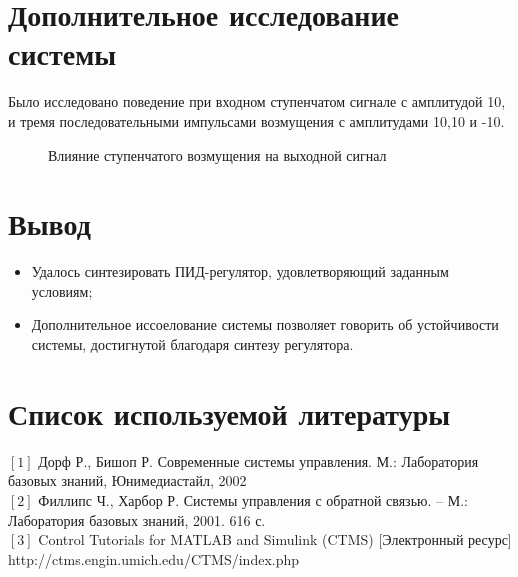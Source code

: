 \documentclass[12pt, a4paper]{report}
\theoremstyle{definition}
\theoremstyle{plain}
\theoremstyle{remark}
\theoremstyle{remark}
\theoremstyle{definition}
\begin{document}
\section{Дополнительное исследование системы}

Было исследовано поведение при входном ступенчатом сигнале с амплитудой 10, и тремя последовательными импульсами возмущения с амплитудами 10,10 и -10.
  \begin{figure}[h!]
    \caption{Влияние ступенчатого возмущения на выходной сигнал}
\end{figure}

\section{Вывод}
\begin{itemize}
\item Удалось синтезировать ПИД-регулятор, удовлетворяющий заданным условиям;
\item Дополнительное иссоелование системы позволяет говорить об устойчивости системы, достигнутой благодаря синтезу регулятора.
 \end{itemize}

\newpage
\section{Список используемой литературы} 
$[1]$ Дорф Р., Бишоп Р. Современные системы управления. М.: Лаборатория базовых знаний, Юнимедиастайл, 2002\\
$[2]$ Филлипс Ч., Харбор Р. Системы управления с обратной связью. – М.: Лаборатория базовых знаний, 2001. 616 с.\\
$[3]$ Control Tutorials for MATLAB and Simulink (CTMS) [Электронный ресурс] http://ctms.engin.umich.edu/CTMS/index.php
\end{document}
